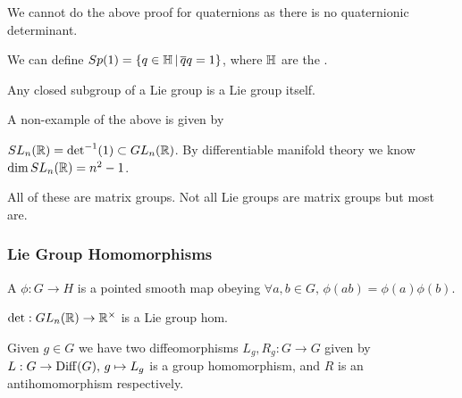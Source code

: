 \documentclass{article}
\begin{document}
\begin{remark}
	We cannot do the above proof for quaternions as there is no quaternionic determinant. 
\end{remark}

\begin{example}
	We can define $Sp(1) = \left\{ q \in \mathbb{H} \, | \, \overline{q}q = 1 \right\}$, where $\mathbb{H}$ are the . 
\end{example}

\begin{theorem}[Cartan]
Any closed subgroup of a Lie group is a Lie group itself. 
\end{theorem}

\begin{example}
A non-example of the above is given by 
\end{example}

\begin{example}
$SL_n(\mathbb{R}) = \det^{-1}(1) \subset GL_n(\mathbb{R})$. By differentiable manifold theory we know $\dim SL_n(\mathbb{R}) = n^2-1$. 
\end{example}



\begin{remark}
All of these are matrix groups. Not all Lie groups are matrix groups but most are. 
\end{remark}

\subsubsection{Lie Group Homomorphisms}

\begin{definition}
	A  $\phi:G \to H$ is a pointed smooth map obeying $\forall a,b \in G, \, \phi(ab) = \phi(a)\phi(b)$. 
\end{definition}

\begin{example}
	$\det : GL_n(\mathbb{R}) \to \mathbb{R}^\times$ is a Lie group hom. 
\end{example}

\begin{definition}
	Given $g \in G$ we have two diffeomorphisms $L_g, R_g : G \to G$ given by 
$L:G \to \operatorname{Diff}(G), \, g \mapsto L_g$ is a group homomorphism, and $R$ is an antihomomorphism respectively. 
\end{definition}
\end{document}
